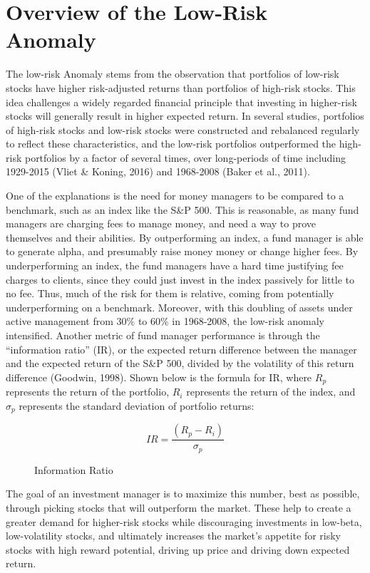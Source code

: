 \documentclass[12pt,twoside]{reedthesis}
\theoremstyle{definition}
\theoremstyle{definition}
\theoremstyle{definition}
\theoremstyle{remark}
\begin{document}
\section{Overview of the Low-Risk
Anomaly}\label{overview-of-the-low-risk-anomaly}

The low-risk Anomaly stems from the observation that portfolios of
low-risk stocks have higher risk-adjusted returns than portfolios of
high-risk stocks. This idea challenges a widely regarded financial
principle that investing in higher-risk stocks will generally result in
higher expected return. In several studies, portfolios of high-risk
stocks and low-risk stocks were constructed and rebalanced regularly to
reflect these characteristics, and the low-risk portfolios outperformed
the high-risk portfolios by a factor of several times, over long-periods
of time including 1929-2015 (Vliet \& Koning, 2016) and 1968-2008 (Baker
et al., 2011).

One of the explanations is the need for money managers to be compared to
a benchmark, such as an index like the S\&P 500. This is reasonable, as
many fund managers are charging fees to manage money, and need a way to
prove themselves and their abilities. By outperforming an index, a fund
manager is able to generate alpha, and presumably raise money money or
change higher fees. By underperforming an index, the fund managers have
a hard time justifying fee charges to clients, since they could just
invest in the index passively for little to no fee. Thus, much of the
risk for them is relative, coming from potentially underperforming on a
benchmark. Moreover, with this doubling of assets under active
management from 30\% to 60\% in 1968-2008, the low-risk anomaly
intensified. Another metric of fund manager performance is through the
``information ratio'' (IR), or the expected return difference between
the manager and the expected return of the S\&P 500, divided by the
volatility of this return difference (Goodwin, 1998). Shown below is the
formula for IR, where \(R_p\) represents the return of the portfolio,
\(R_i\) represents the return of the index, and \(\sigma_p\) represents
the standard deviation of portfolio returns:
\begin{figure}
$$ IR = \frac{(R_p - R_i)} {\sigma_p}$$
\caption{Information Ratio}
\end{figure}
The goal of an investment manager is to maximize this number, best as
possible, through picking stocks that will outperform the market. These
help to create a greater demand for higher-risk stocks while
discouraging investments in low-beta, low-volatility stocks, and
ultimately increases the market's appetite for risky stocks with high
reward potential, driving up price and driving down expected return.
\end{document}
